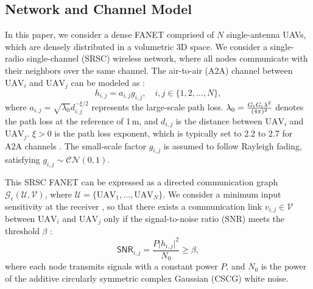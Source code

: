 \documentclass[journal]{IEEEtran}
\begin{document}
	\subsection{Network and Channel Model}
	In this paper, we consider a dense FANET comprised of $N$ single-antenna UAVs, which are densely distributed in a volumetric 3D space. We consider a single-radio single-channel (SRSC) wireless network, where all nodes communicate with their neighbors over the same channel. The air-to-air (A2A) channel between $\mathrm{UAV}_i$ and $\mathrm{UAV}_j$ can be modeled as \cite{jpnoma}:
	\begin{equation}
		h_{i,j}=a_{i,j}g_{i,j}, \quad i,j\in\{1,2,\ldots,N\},
	\end{equation}
	where $a_{i,j} = \sqrt{\lambda_0}d_{i,j}^{-\xi/2}$ represents the large-scale path loss. 
	$\lambda_0 = \frac{G_{\rm t}G_{\rm r}\lambda^2}{(4\pi)^2}$ denotes the path loss at the reference of 1\,m, and $d_{i,j}$ is the distance between $\mathrm{UAV}_i$ and $\mathrm{UAV}_j$. $\xi>0$ is the path loss exponent, which is typically set to 2.2 to 2.7 for A2A channels \cite{liu2019A2AModel}. The small-scale factor $g_{i,j}$ is assumed to follow Rayleigh fading, satisfying $g_{i,j}\sim \mathcal{CN}(0,1)$. 
	
	This SRSC FANET can be expressed as a directed communication graph $\mathcal{G}_c(\mathcal{U}, \mathcal{V})$, where $\mathcal{U}=\{\mathrm{UAV}_1, \ldots, \mathrm{UAV}_N\}$. We consider a minimum input sensitivity at the receiver \cite{80211be}, so that there exists a communication link $v_{i,j}\in \mathcal{V}$ between $\mathrm{UAV}_i$ and $\mathrm{UAV}_j$ only if the signal-to-noise ratio (SNR) meets the threshold $\beta$ \cite{jxpylon}:
	\begin{equation}
		\mathsf{SNR}_{i,j} = \frac{P\vert h_{i,j}\vert^2}{N_0} \geq \beta,
	\end{equation}
	where each node transmits signals with a constant power $P$, and $N_0$ is the power of the additive circularly symmetric complex Gaussian (CSCG) white noise.
	
\end{document}
